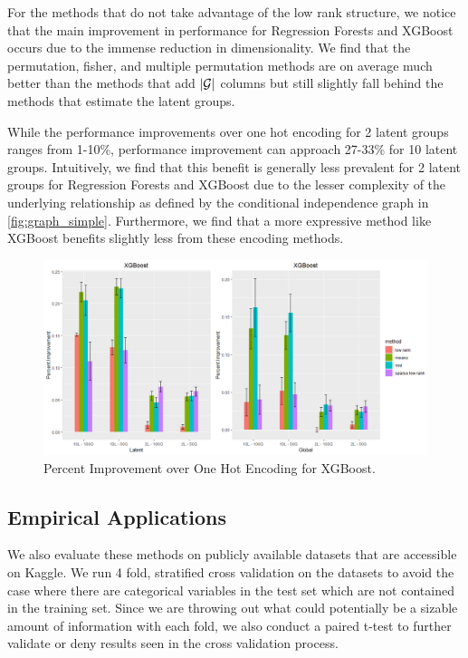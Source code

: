 \documentclass{article}
\theoremstyle{plain}
\theoremstyle{definition}
\theoremstyle{remark}
\begin{document}
For the methods that do not take advantage of the low rank structure, we notice that the main improvement in performance for Regression Forests and XGBoost occurs due to the immense reduction in dimensionality. We find that the permutation, fisher, and multiple permutation methods are on average much better than the methods that add $|\mathcal{G}|$ columns but still slightly fall behind the methods that estimate the latent groups. 

While the performance improvements over one hot encoding for 2 latent groups ranges from 1-10\%, performance improvement can approach 27-33\% for 10 latent groups. Intuitively, we find that this benefit is generally less prevalent for 2 latent groups for Regression Forests and XGBoost due to the lesser complexity of the underlying relationship as defined by the conditional independence graph in \ref{fig:graph_simple}. Furthermore, we find that a more expressive method like XGBoost benefits slightly less from these encoding methods. 

\begin{figure}[htbp]
	\centering
	\includegraphics[width=\linewidth]{figures/xgboost_sims.png}
	\caption {Percent Improvement over One Hot Encoding for XGBoost.}
	\label{tab:xgb_sim_setups}
\end{figure}



\subsection{Empirical Applications}
\label{sec:empirical_applications}

We also evaluate these methods on publicly available datasets that are accessible on Kaggle. We run 4 fold, stratified cross validation on the datasets to avoid the case where there are categorical variables in the test set which are not contained in the training set. Since we are throwing out what could potentially be a sizable amount of information with each fold, we also conduct a paired t-test to further validate or deny results seen in the cross validation process.
\end{document}

